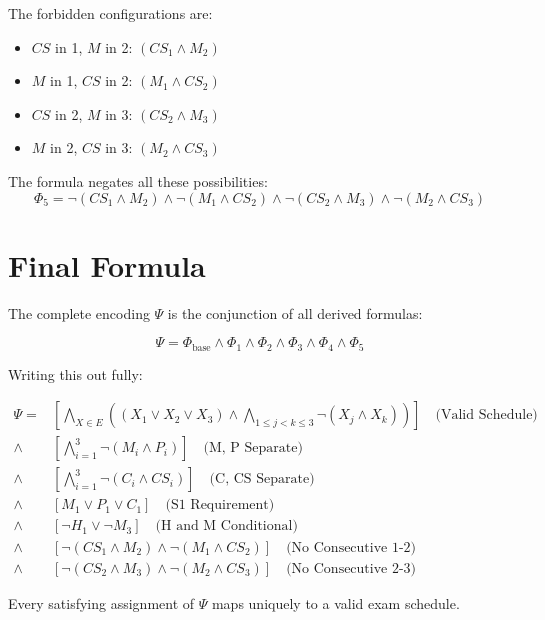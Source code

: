 \documentclass[12pt, a4paper]{article}
\begin{document}
The forbidden configurations are:
\begin{itemize}
    \item $CS$ in 1, $M$ in 2: $(CS_1 \land M_2)$
    \item $M$ in 1, $CS$ in 2: $(M_1 \land CS_2)$
    \item $CS$ in 2, $M$ in 3: $(CS_2 \land M_3)$
    \item $M$ in 2, $CS$ in 3: $(M_2 \land CS_3)$
\end{itemize}

The formula negates all these possibilities:
$$ \Phi_5 = \neg(CS_1 \land M_2) \land \neg(M_1 \land CS_2) \land \neg(CS_2 \land M_3) \land \neg(M_2 \land CS_3) $$

\section{Final Formula}

The complete encoding $\Psi$ is the conjunction of all derived formulas:

$$ \Psi = \Phi_{\text{base}} \land \Phi_1 \land \Phi_2 \land \Phi_3 \land \Phi_4 \land \Phi_5 $$

Writing this out fully:

\begin{align*}
    \Psi = & \left[ \bigwedge_{X \in E} \left( (X_1 \lor X_2 \lor X_3) \land \bigwedge_{1 \le j < k \le 3} \neg(X_j \land X_k) \right) \right] \quad \text{(Valid Schedule)} \\
    \land & \left[ \bigwedge_{i=1}^{3} \neg(M_i \land P_i) \right] \quad \text{(M, P Separate)} \\
    \land & \left[ \bigwedge_{i=1}^{3} \neg(C_i \land CS_i) \right] \quad \text{(C, CS Separate)} \\
    \land & \left[ M_1 \lor P_1 \lor C_1 \right] \quad \text{(S1 Requirement)} \\
    \land & \left[ \neg H_1 \lor \neg M_3 \right] \quad \text{(H and M Conditional)} \\
    \land & \left[ \neg(CS_1 \land M_2) \land \neg(M_1 \land CS_2) \right] \quad \text{(No Consecutive 1-2)} \\
    \land & \left[ \neg(CS_2 \land M_3) \land \neg(M_2 \land CS_3) \right] \quad \text{(No Consecutive 2-3)}
\end{align*}

Every satisfying assignment of $\Psi$ maps uniquely to a valid exam schedule.
\end{document}
